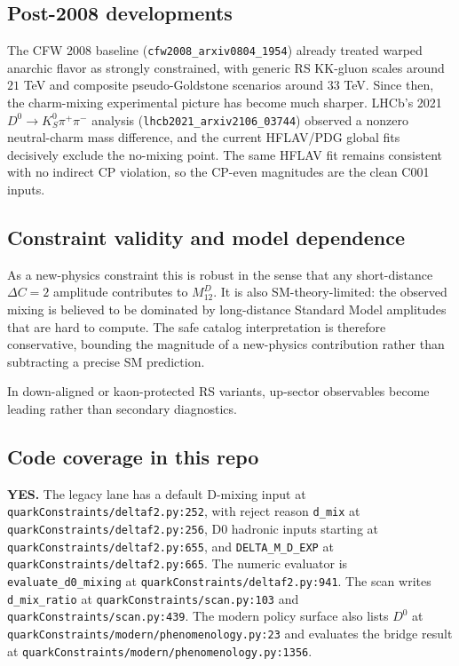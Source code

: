\subsection*{Post-2008 developments}
The CFW 2008 baseline (\texttt{cfw2008\_arxiv0804\_1954}) already treated
warped anarchic flavor as strongly constrained, with generic RS KK-gluon
scales around \(21\) TeV and composite pseudo-Goldstone scenarios around
\(33\) TeV.  Since then, the charm-mixing experimental picture has become much
sharper.  LHCb's 2021 \(D^0\to K_S^0\pi^+\pi^-\) analysis
(\texttt{lhcb2021\_arxiv2106\_03744}) observed a nonzero neutral-charm mass
difference, and the current HFLAV/PDG global fits decisively exclude the
no-mixing point.  The same HFLAV fit remains consistent with no indirect CP
violation, so the CP-even magnitudes are the clean C001 inputs.

\subsection*{Constraint validity and model dependence}
As a new-physics constraint this is robust in the sense that any short-distance
\(\Delta C=2\) amplitude contributes to \(M_{12}^D\).  It is also
SM-theory-limited: the observed mixing is believed to be dominated by
long-distance Standard Model amplitudes that are hard to compute.  The safe
catalog interpretation is therefore conservative, bounding the magnitude of a
new-physics contribution rather than subtracting a precise SM prediction.

In down-aligned or kaon-protected RS variants, up-sector observables become
leading rather than secondary diagnostics.

\subsection*{Code coverage in this repo}
\textbf{YES.}  The legacy lane has a default D-mixing input at
\texttt{quarkConstraints/deltaf2.py:252}, with reject reason
\texttt{d\_mix} at \texttt{quarkConstraints/deltaf2.py:256}, D0 hadronic inputs
starting at \texttt{quarkConstraints/deltaf2.py:655}, and
\texttt{DELTA\_M\_D\_EXP} at \texttt{quarkConstraints/deltaf2.py:665}.  The
numeric evaluator is \texttt{evaluate\_d0\_mixing} at
\texttt{quarkConstraints/deltaf2.py:941}.  The scan writes
\texttt{d\_mix\_ratio} at \texttt{quarkConstraints/scan.py:103} and
\texttt{quarkConstraints/scan.py:439}.  The modern policy surface also lists
\(D^0\) at \texttt{quarkConstraints/modern/phenomenology.py:23} and evaluates
the bridge result at \texttt{quarkConstraints/modern/phenomenology.py:1356}.

